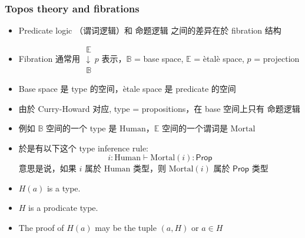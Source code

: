 \documentclass[16pt]{beamer}
\begin{document}
\begin{frame}
\frametitle{Topos theory and fibrations}
\begin{itemize}
\item Predicate logic （谓词逻辑）和 命题逻辑 之间的差异在於 fibration 结构
\item Fibration 通常用 $\mathrel{\substack{\mathbb{E}\\\downarrow \\\mathbb{B}}  {\scriptstyle p}}$ 表示，$\mathbb{B}$ = base space, $\mathbb{E}$ = \`{e}tal\`{e} space, $p$ = projection
\item Base space 是 type 的空间，\`{e}tale space 是 predicate 的空间
\item 由於 Curry-Howard 对应, type = propositions，在 base 空间上只有 命题逻辑
\item 例如 $\mathbb{B}$ 空间的一个 type 是 $\mathrm{Human}$，$\mathbb{E}$ 空间的一个谓词是 $\mathrm{Mortal}$
\item 於是有以下这个 type inference rule:
\begin{equation}
i:\mathrm{Human} \vdash \mathrm{Mortal}(i): \mathsf{Prop}
\end{equation}
意思是说，如果 $i$ 属於 $\mathrm{Human}$ 类型，则 $\mathrm{Mortal}(i)$ 属於 $\mathsf{Prop}$ 类型
\end{itemize}
\end{frame}

\begin{frame}
\begin{itemize}
\item $H(a)$ is a type.
\item $H$ is a prodicate type.
\item The proof of $H(a)$ may be the tuple $(a, H)$ or $a \in H$
\end{itemize}
\end{frame}
\end{document}
